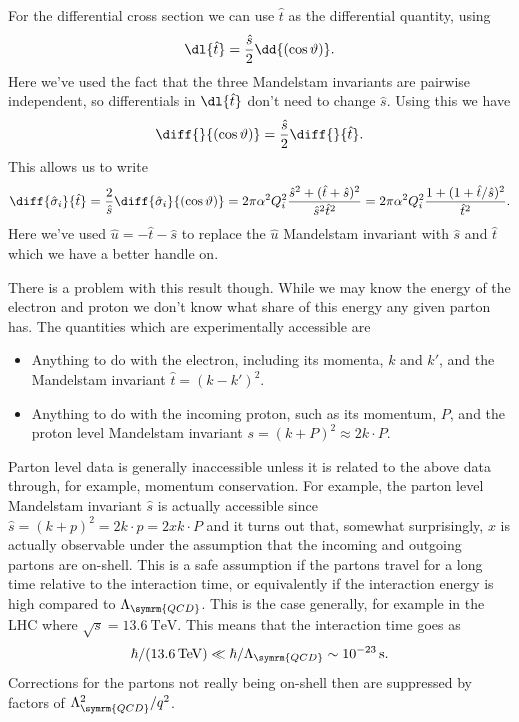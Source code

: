 \documentclass[fleqn]{NotesClass}
\begin{document}
    For the differential cross section we can use \(\hat{t}\) as the differential quantity, using
    \begin{equation}
        \dl{\hat{t}} = \frac{\hat{s}}{2} \dd{(\cos\vartheta)}.
    \end{equation}
    Here we've used the fact that the three Mandelstam invariants are pairwise independent, so differentials in \(\dl{\hat{t}}\) don't need to change \(\hat{s}\).
    Using this we have
    \begin{equation}
        \diff{}{(\cos\vartheta)} = \frac{\hat{s}}{2}\diff{}{\hat{t}}.
    \end{equation}
    This allows us to write
    \begin{equation}
        \diff{\hat{\sigma}_i}{\hat{t}} = \frac{2}{\hat{s}} \diff{\hat{\sigma}_i}{(\cos\vartheta)} = 2\pi \alpha^2 Q_i^2 \frac{\hat{s}^2 + (\hat{t} + \hat{s})^2}{\hat{s}^2 \hat{t}^2} = 2\pi \alpha^2 Q_i^2 \frac{1 + (1 + \hat{t}/\hat{s})^2}{\hat{t}^2}.
    \end{equation}
    Here we've used \(\hat{u} = -\hat{t} - \hat{s}\) to replace the \(\hat{u}\) Mandelstam invariant with \(\hat{s}\) and \(\hat{t}\) which we have a better handle on.
    
    There is a problem with this result though.
    While we may know the energy of the electron and proton we don't know what share of this energy any given parton has.
    The quantities which are experimentally accessible are
    \begin{itemize}
        \item Anything to do with the electron, including its momenta, \(k\) and \(k'\), and the Mandelstam invariant \(\hat{t} = (k - k')^2\).
        \item Anything to do with the incoming proton, such as its momentum, \(P\), and the proton level Mandelstam invariant \(s = (k + P)^2 \approx 2k \cdot P\).
    \end{itemize}
    Parton level data is generally inaccessible unless it is related to the above data through, for example, momentum conservation.
    For example, the parton level Mandelstam invariant \(\hat{s}\) is actually accessible since \(\hat{s} = (k + p)^2 = 2k\cdot p = 2xk \cdot P\) and it turns out that, somewhat surprisingly, \(x\) is actually observable under the assumption that the incoming and outgoing partons are on-shell.
    This is a safe assumption if the partons travel for a long time relative to the interaction time, or equivalently if the interaction energy is high compared to \(\Lambda_{\symrm{QCD}}\).
    This is the case generally, for example in the LHC where \(\sqrt{s} = \qty{13.6}{\tera\electronvolt}\).
    This means that the interaction time goes as
    \begin{equation}
        \hbar/(\qty{13.6}{\tera\electronvolt}) \ll \hbar/\Lambda_{\symrm{QCD}} \sim 10^{-23}\,\unit{\second}.
    \end{equation}
    Corrections for the partons not really being on-shell then are suppressed by factors of \(\Lambda_{\symrm{QCD}}^2/q^2\).
    
\end{document}
